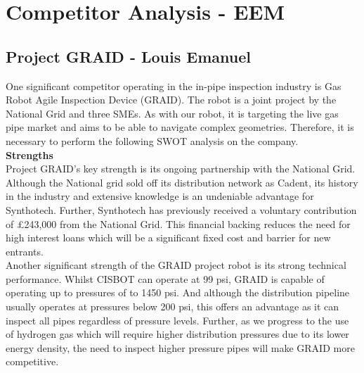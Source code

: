 \documentclass[11pt]{article}		%
\begin{document}
		\section{Competitor Analysis - EEM}
		
		\subsection[Project GRAID]{Project GRAID - Louis Emanuel}
			One significant competitor operating in the in-pipe inspection industry is Gas Robot Agile Inspection Device (GRAID). The robot is a joint project by the National Grid and three SMEs. As with our robot, it is targeting the live gas pipe market and aims to be able to navigate complex geometries. Therefore, it is necessary to perform the following SWOT analysis on the company. \\
			
			\textbf{Strengths} \\
			Project GRAID's key strength is its ongoing partnership with the National Grid. Although the National grid sold off its distribution network as Cadent, its history in the industry and extensive knowledge is an undeniable advantage for Synthotech. Further, Synthotech has previously received a voluntary contribution of £243,000 from the National Grid. This financial backing reduces the need for high interest loans which will be a significant fixed cost and barrier for new entrants. \\
		    \hspace*{3ex}Another significant strength of the GRAID project robot is its strong technical performance. Whilst CISBOT can operate at 99 psi, GRAID is capable of operating up to pressures of to 1450 psi. And although the distribution pipeline usually operates at pressures below 200 psi, this offers an advantage as it can inspect all pipes regardless of pressure levels. Further, as we progress to the use of hydrogen gas which will require higher distribution pressures due to its lower energy density, the need to inspect higher pressure pipes will make GRAID more competitive. 
	        
\end{document}
